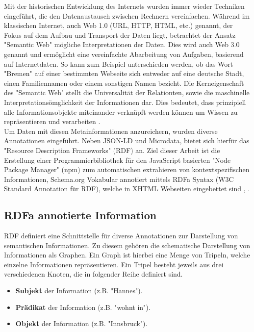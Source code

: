 \documentclass[hidelinks, a4paper, 11pt]{article} %
\begin{document}
Mit der historischen Entwicklung des Internets wurden immer wieder Techniken eingef\"uhrt, die den Datenaustausch zwischen Rechnern vereinfachen. W\"ahrend im klassischen Internet, auch Web 1.0 (URL, HTTP, HTML, etc.) genannt, der Fokus auf dem Aufbau und Transport der Daten liegt, betrachtet der Ansatz "Semantic Web" m\"ogliche Interpretationen der Daten. Dies wird auch Web 3.0 genannt und erm\"oglicht eine vereinfachte Abarbeitung von Aufgaben, basierend auf Internetdaten. So kann zum Beispiel unterschieden werden, ob das Wort "Bremen" auf einer bestimmten Webseite sich entweder auf eine deutsche Stadt, einen Familiennamen oder einem sonstigen Namen bezieht. Die Kerneigenschaft des "Semantic Web" stellt die Universalit\"at der Relationten, sowie die maschinelle Interpretations\"omglichkeit der Informationen dar. Dies bedeutet, dass prinzipiell alle Informationsobjekte miteinander verkn\"upft werden k\"onnen um Wissen zu repr\"asentieren und verarbeiten \cite{berners2001semantic}. \\

Um Daten mit diesen Metainformationen anzureichern, wurden diverse Annotationen eingef\"uhrt. Neben JSON-LD und Microdata, bietet sich hierf\"ur das "Resource Description Frameworks" (RDF) an. Ziel dieser Arbeit ist die Erstellung einer Programmierbibliothek f\"ur den JavaScript basierten "Node Package Manager" (npm) zum automatischen extrahieren von kontextspezifischen Informationen, Schema.org Vokabular annotiert mittels RDFa Syntax (W3C Standard Annotation f\"ur RDF), welche in XHTML Webseiten eingebettet sind \cite{guha2016schema}, \cite{halb2008building}.

\subsection{RDFa annotierte Information}

RDF definiert eine Schnittstelle f\"ur diverse Annotationen zur Darstellung von semantischen Informationen. Zu diesem geh\"oren die schematische Darstellung von Informationen als Graphen. Ein Graph ist hierbei eine Menge von Tripeln, welche einzelne Informationen repr\"asentieren. Ein Tripel besteht jeweils aus drei verschiedenen Knoten, die in folgender Reihe definiert sind. 

\begin{itemize}
\item \textbf{Subjekt} der Information (z.B. "Hannes").
\item \textbf{Pr\"adikat} der Information (z.B. "wohnt in").
\item \textbf{Objekt} der Information (z.B. "Innsbruck").
\end{itemize}
\end{document}
